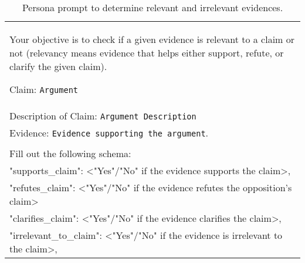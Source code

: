 \begin{table*}[h]
\centering
\begin{tabularx}{\textwidth}{|X|}
\hline
Your objective is to check if a given evidence is relevant to a claim or not (relevancy means evidence that helps either support, refute, or clarify the given claim).

Claim: \texttt{Argument}\\
Description of Claim: \texttt{Argument Description}\\
Evidence: \texttt{Evidence supporting the argument}.\\
\\
Fill out the following schema:\\
"supports\_claim": <"Yes"/"No" if the evidence supports the claim>,\\
"refutes\_claim": <"Yes"/"No" if the evidence refutes the opposition's claim>\\
"clarifies\_claim": <"Yes"/"No" if the evidence clarifies the claim>,\\
"irrelevant\_to\_claim": <"Yes"/"No" if the evidence is irrelevant to the claim>,
 \\ \hline
\end{tabularx}
\caption{Persona prompt to determine relevant and irrelevant evidences.}
\label{prompt_persona: is_irrelevant_evidences}
\end{table*}

